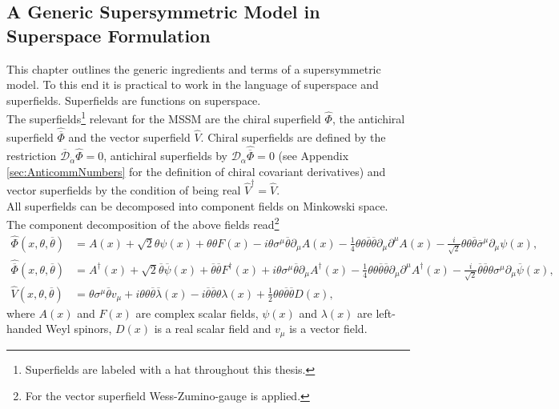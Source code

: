 \subsection{A Generic Supersymmetric Model in Superspace Formulation}
This chapter outlines the generic ingredients and terms of a supersymmetric model. To this end it is practical to work in the language of superspace and superfields. Superfields are functions on superspace.\\
The superfields\footnote{Superfields are labeled with a hat throughout this thesis.} relevant for the MSSM are the chiral superfield $\hat{\Phi}$, the antichiral superfield $\hat{\overline{\Phi}}$ and the vector superfield $\hat{V}$. Chiral superfields are defined by the restriction $\overline{\mathcal{D}}_{\dot{\alpha}}\hat{\Phi} = 0$, antichiral superfields by $\mathcal{D}_\alpha\hat{\overline{\Phi}} = 0$ (see Appendix \ref{sec:AnticommNumbers} for the definition of chiral covariant derivatives) and vector superfields by the condition of being real $\hat{V}^\dagger = \hat{V}$.\\
All superfields can be decomposed into component fields on Minkowski space. The component decomposition of the above fields read\footnote{For the vector superfield Wess-Zumino-gauge is applied.}
\begin{align}
\hat{\Phi}(x,\theta,\overline{\theta}) &= A(x) + \sqrt{2}\theta\psi(x) + \theta\theta F(x) - i\theta\sigma^\mu \overline{\theta}\partial_\mu A(x) - \frac{1}{4}\theta\theta\overline{\theta}\overline{\theta}\partial_\mu\partial^\mu A(x) - \frac{i}{\sqrt{2}}\theta\theta\overline{\theta}\overline{\sigma}^\mu \partial_\mu\psi(x),\nonumber\\
\hat{\overline{\Phi}}(x,\theta,\overline{\theta}) &= A^\dagger(x) + \sqrt{2}\overline{\theta}\overline{\psi}(x) + \overline{\theta}\overline{\theta} F^\dagger(x) + i\theta\sigma^\mu \overline{\theta}\partial_\mu A^\dagger(x) - \frac{1}{4}\theta\theta\overline{\theta}\overline{\theta}\partial_\mu\partial^\mu A^\dagger(x) - \frac{i}{\sqrt{2}}\overline{\theta}\overline{\theta}\theta\sigma^\mu \partial_\mu\overline{\psi}(x),\nonumber\\
\hat{V}(x,\theta,\overline{\theta}) &= \theta\sigma^\mu\overline{\theta} v_\mu + i\theta\theta\overline{\theta}\overline{\lambda}(x) -i \overline{\theta}\overline{\theta}\theta\lambda(x) + \frac{1}{2}\theta\theta\overline{\theta}\overline{\theta}D(x),\label{eq:superfielddecomp}
\end{align}
where $A(x)$ and $F(x)$ are complex scalar fields, $\psi(x)$ and $\lambda(x)$ are left-handed Weyl spinors, $D(x)$ is a real scalar field and $v_\mu$ is a vector field.\\
